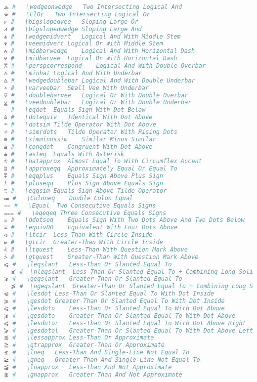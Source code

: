 \begin{lstlisting}[language=Julia, style=julia, linewidth=\textwidth]
⩕ #   \wedgeonwedge   Two Intersecting Logical And
⩖ #   \ElOr   Two Intersecting Logical Or
⩗ #   \bigslopedvee   Sloping Large Or
⩘ #   \bigslopedwedge Sloping Large And
⩚ #   \wedgemidvert   Logical And With Middle Stem
⩛ #   \veemidvert Logical Or With Middle Stem
⩜ #   \midbarwedge    Logical And With Horizontal Dash
⩝ #   \midbarvee  Logical Or With Horizontal Dash
⩞ #   \perspcorrespond    Logical And With Double Overbar
⩟ #   \minhat Logical And With Underbar
⩠ #   \wedgedoublebar Logical And With Double Underbar
⩡ #   \varveebar  Small Vee With Underbar
⩢ #   \doublebarvee   Logical Or With Double Overbar
⩣ #   \veedoublebar   Logical Or With Double Underbar
⩦ #   \eqdot  Equals Sign With Dot Below
⩧ #   \dotequiv   Identical With Dot Above
⩪ #   \dotsim Tilde Operator With Dot Above
⩫ #   \simrdots   Tilde Operator With Rising Dots
⩬ #   \simminussim    Similar Minus Similar
⩭ #   \congdot    Congruent With Dot Above
⩮ #   \asteq  Equals With Asterisk
⩯ #   \hatapprox  Almost Equal To With Circumflex Accent
⩰ #   \approxeqq  Approximately Equal Or Equal To
⩱ #   \eqqplus    Equals Sign Above Plus Sign
⩲ #   \pluseqq    Plus Sign Above Equals Sign
⩳ #   \eqqsim Equals Sign Above Tilde Operator
⩴ #   \Coloneq    Double Colon Equal
⩵ #   \Equal  Two Consecutive Equals Signs
⩶ #   \eqeqeq Three Consecutive Equals Signs
⩷ #   \ddotseq    Equals Sign With Two Dots Above And Two Dots Below
⩸ #   \equivDD    Equivalent With Four Dots Above
⩹ #   \ltcir  Less-Than With Circle Inside
⩺ #   \gtcir  Greater-Than With Circle Inside
⩻ #   \ltquest    Less-Than With Question Mark Above
⩼ #   \gtquest    Greater-Than With Question Mark Above
⩽ #   \leqslant   Less-Than Or Slanted Equal To
  ⩽̸ #  \nleqslant  Less-Than Or Slanted Equal To + Combining Long Solidus Overlay
⩾ #   \geqslant   Greater-Than Or Slanted Equal To
  ⩾̸ #  \ngeqslant  Greater-Than Or Slanted Equal To + Combining Long Solidus Overlay
⩿ #   \lesdot Less-Than Or Slanted Equal To With Dot Inside
⪀ #   \gesdot Greater-Than Or Slanted Equal To With Dot Inside
⪁ #   \lesdoto    Less-Than Or Slanted Equal To With Dot Above
⪂ #   \gesdoto    Greater-Than Or Slanted Equal To With Dot Above
⪃ #   \lesdotor   Less-Than Or Slanted Equal To With Dot Above Right
⪄ #   \gesdotol   Greater-Than Or Slanted Equal To With Dot Above Left
⪅ #   \lessapprox Less-Than Or Approximate
⪆ #   \gtrapprox  Greater-Than Or Approximate
⪇ #   \lneq   Less-Than And Single-Line Not Equal To
⪈ #   \gneq   Greater-Than And Single-Line Not Equal To
⪉ #   \lnapprox   Less-Than And Not Approximate
⪊ #   \gnapprox   Greater-Than And Not Approximate

\end{lstlisting}
